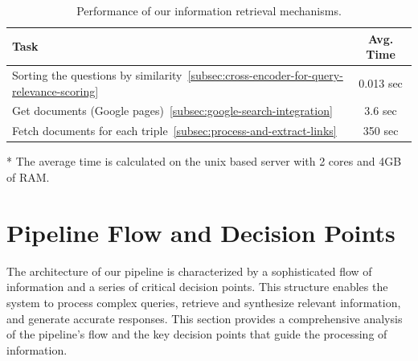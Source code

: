 \begin{table}[ht!]
    \centering
    \caption{Performance of our information retrieval mechanisms.}
    \begin{threeparttable}
        \begin{tabular}{lc}
            \toprule
            \textbf{Task} & \textbf{Avg. Time}\tnote{*} \\
            \midrule
            Sorting the questions by similarity~\ref{subsec:cross-encoder-for-query-relevance-scoring} & 0.013 sec \\
            Get documents (Google pages)~\ref{subsec:google-search-integration} & 3.6 sec \\
            Fetch documents for each triple~\ref{subsec:process-and-extract-links} & 350 sec \\
            \bottomrule
        \end{tabular}
        \begin{tablenotes}
            \item[*] The average time is calculated on the unix based server with 2 cores and 4GB of RAM\@.
        \end{tablenotes}
    \end{threeparttable}
    \label{tab:pipeline-performance-report-2}
\end{table}

\section{Pipeline Flow and Decision Points}\label{sec:pipeline-flow-and-decision-points}
The architecture of our pipeline is characterized by a sophisticated flow of information and a series of critical decision points.
This structure enables the system to process complex queries, retrieve and synthesize relevant information, and generate accurate responses.
This section provides a comprehensive analysis of the pipeline's flow and the key decision points that guide the processing of information.

